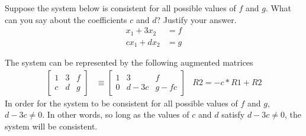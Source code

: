 \documentclass{../mathhomework}
\begin{document}
\pagebreak
\begin{problem}[1.1\#27]
    Suppose the system below is consistent for all possible values of $f$ and $g$. What can you say about the coefficients $c$ and $d$? Justify your answer.
    \begin{align*}
        x_1 + 3x_2 & = f \\
        cx_1 + dx_2 & = g
    \end{align*}

    \begin{solution}
        The system can be represented by the following augmented matrices
        \begin{align*}
            \begin{bmatrix}
                1 & 3 & f \\
                c & d & g
            \end{bmatrix}
            & \equiv
            \begin{bmatrix}
                1 & 3 & f \\
                0 & d - 3c & g - fc
            \end{bmatrix}
            & R2 = -c * R1 + R2
        \end{align*}
        In order for the system to be consistent for all possible values of $f$ and $g$, $d - 3c \neq 0$. In other words, so long as the values of $c$ and $d$ 
        satisfy $d - 3c \neq 0$, the system will be consistent.
    \end{solution}
\end{problem}
\end{document}
